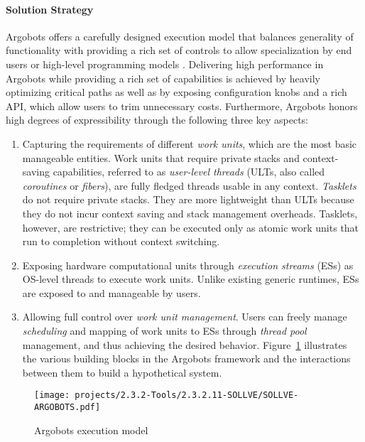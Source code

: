 \paragraph{Solution Strategy}
Argobots offers a carefully designed execution model that balances
generality of functionality with providing a rich set of controls to
allow specialization by end users or high-level programming models
\cite{seo2018}.  Delivering high performance in Argobots while
providing a rich set of capabilities is achieved by heavily optimizing
critical paths as well as by exposing configuration knobs and a rich
API, which allow users to trim unnecessary costs. Furthermore,
Argobots honors high degrees of expressibility through the following
three key aspects:

\begin{enumerate}

\item Capturing the requirements of different \emph{work units}, which
are the most basic manageable entities. Work units that require
private stacks and context-saving capabilities, referred to as
\textit{user-level threads} (ULTs, also called \textit{coroutines} or
\textit{fibers}), are fully fledged threads usable in any context.
\emph{Tasklets} do not require private stacks. They are more
lightweight than ULTs because they do not incur context saving and
stack management overheads.  Tasklets, however, are restrictive; they
can be executed only as atomic work units that run to completion
without context switching.

\item Exposing hardware computational units through \emph{execution
streams} (ESs) as OS-level threads to execute work units. Unlike
existing generic runtimes, ESs are exposed to and manageable by users.

\item Allowing full control over \emph{work unit management}.  Users
can freely manage \emph{scheduling} and mapping of work units to ESs
through \emph{thread pool} management, and thus achieving the desired
behavior. Figure~\ref{fig:sollve-argobots} illustrates the various
building blocks in the Argobots framework and the interactions between
them to build a hypothetical system.

\end{enumerate}

\begin{figure}[htb]
  \centering
  \texttt{[image: projects/2.3.2-Tools/2.3.2.11-SOLLVE/SOLLVE-ARGOBOTS.pdf]}
  \caption{\label{fig:sollve-argobots}Argobots execution model}
\end{figure}

